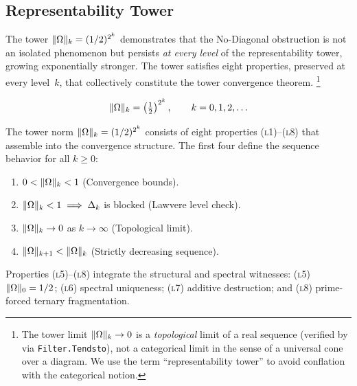 \subsection{Representability Tower}\label{ssec:cat-limit}

The tower $\|\Omega\|_k = (1/2)^{2^k}$ demonstrates that the No-Diagonal
obstruction is not an isolated phenomenon but persists \emph{at every level}
of the representability tower, growing exponentially stronger.  The tower
satisfies eight properties, preserved at every level~$k$, that collectively
constitute the tower convergence theorem.%
\footnote{The tower limit $\|\Omega\|_k\to 0$ is a \emph{topological} 
limit of a real sequence (verified by  
via \texttt{Filter.Tendsto}), not a categorical limit in the sense of 
a universal cone over a diagram. We use the term ``representability 
tower'' to avoid conflation with the categorical notion.}

\begin{definition}\label{def:Omega-norm-tower}
\begin{equation}\label{eq:Omega-norm}
  \|\Omega\|_k = \left(\tfrac{1}{2}\right)^{2^k},
  \qquad k = 0,1,2,\ldots
\end{equation}
\end{definition}

\begin{lemma}\label{lem:tower-properties}
The tower norm $\|\Omega\|_k = (1/2)^{2^k}$ consists of eight properties (\textsc{l}1)--(\textsc{l}8) that assemble into the convergence structure. The first four define the sequence behavior for all $k \ge 0$:
\begin{enumerate}[label=(\textsc{l}\arabic*), leftmargin=3em]
  \item $0 < \|\Omega\|_k < 1$ (Convergence bounds).
  \item $\|\Omega\|_k < 1 \implies \Delta_k$ is blocked (Lawvere level check).
  \item $\|\Omega\|_k \to 0$ as $k \to \infty$ (Topological limit).
  \item $\|\Omega\|_{k+1} < \|\Omega\|_k$ (Strictly decreasing sequence).
\end{enumerate}
Properties (\textsc{l}5)--(\textsc{l}8) integrate the structural and spectral witnesses: (\textsc{l}5) $\|\Omega\|_0 = 1/2$; (\textsc{l}6) spectral uniqueness; (\textsc{l}7) additive destruction; and (\textsc{l}8) prime-forced ternary fragmentation.
\end{lemma}


